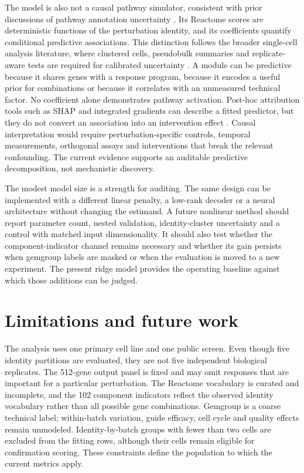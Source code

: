 \documentclass[10pt]{article}
\begin{document}
The model is also not a causal pathway simulator, consistent with prior discussions of pathway annotation uncertainty \citep{pmid21199820}. Its Reactome scores are deterministic functions of the perturbation identity, and its coefficients quantify conditional predictive associations. This distinction follows the broader single-cell analysis literature, where clustered cells, pseudobulk summaries and replicate-aware tests are required for calibrated uncertainty \citep{luecken2022,hao2021,kiselev2018,lun2016,benjamini1995,mccarthy2012}. A module can be predictive because it shares genes with a response program, because it encodes a useful prior for combinations or because it correlates with an unmeasured technical factor. No coefficient alone demonstrates pathway activation. Post-hoc attribution tools such as SHAP and integrated gradients can describe a fitted predictor, but they do not convert an association into an intervention effect \citep{lundberg2017,sundararajan2017}. Causal interpretation would require perturbation-specific controls, temporal measurements, orthogonal assays and interventions that break the relevant confounding. The current evidence supports an auditable predictive decomposition, not mechanistic discovery.

The modest model size is a strength for auditing. The same design can be implemented with a different linear penalty, a low-rank decoder or a neural architecture without changing the estimand. A future nonlinear method should report parameter count, nested validation, identity-cluster uncertainty and a control with matched input dimensionality. It should also test whether the component-indicator channel remains necessary and whether its gain persists when gemgroup labels are masked or when the evaluation is moved to a new experiment. The present ridge model provides the operating baseline against which those additions can be judged.

\section{Limitations and future work}
The analysis uses one primary cell line and one public screen. Even though five identity partitions are evaluated, they are not five independent biological replicates. The 512-gene output panel is fixed and may omit responses that are important for a particular perturbation. The Reactome vocabulary is curated and incomplete, and the 102 component indicators reflect the observed identity vocabulary rather than all possible gene combinations. Gemgroup is a coarse technical label; within-batch variation, guide efficacy, cell cycle and quality effects remain unmodeled. Identity-by-batch groups with fewer than two cells are excluded from the fitting rows, although their cells remain eligible for confirmation scoring. These constraints define the population to which the current metrics apply.
\end{document}
